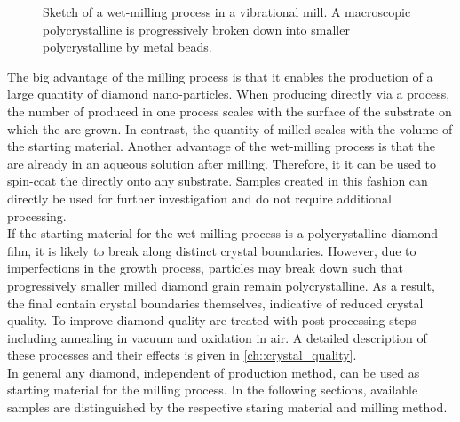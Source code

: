 	\begin{figure}[htp]
		\centering
		\caption[Wet-milling in a vibrational mill]{Sketch of a wet-milling process in a vibrational mill. A macroscopic polycrystalline \nd is progressively broken down into smaller polycrystalline \nds by metal beads.}\label{subfig::sketch_milling}
	\end{figure}

	The big advantage of the milling process is that it enables the production of a large quantity of diamond nano-particles.
	When producing \nds directly via a \CVD process, the number of produced \nds in one process scales with the surface of the substrate on which the \nds are grown.
	In contrast, the quantity of milled \nds scales with the volume of the starting material.
	Another advantage of the wet-milling process is that the \nds are already in an aqueous solution after milling.
	Therefore, it it can be used to spin-coat the \nds directly onto any substrate. Samples created in this fashion can directly be used for further investigation and do not require additional processing.
	\\
	If the starting material for the wet-milling process is a polycrystalline diamond film, it is likely to break along distinct crystal boundaries.
	However, due to imperfections in the growth process, particles may break down such that progressively smaller milled diamond grain remain polycrystalline.
	As a result, the final \nds contain crystal boundaries themselves, indicative of reduced crystal quality.
	To improve diamond quality \nds are treated with post-processing steps including annealing in vacuum and oxidation in air.
	A detailed description of these processes and their effects is given in \autoref{ch::crystal_quality}.
	\\
	In general any diamond, independent of production method, can be used as starting material for the milling process.
	In the following sections, available samples are distinguished by the respective staring material and milling method.

